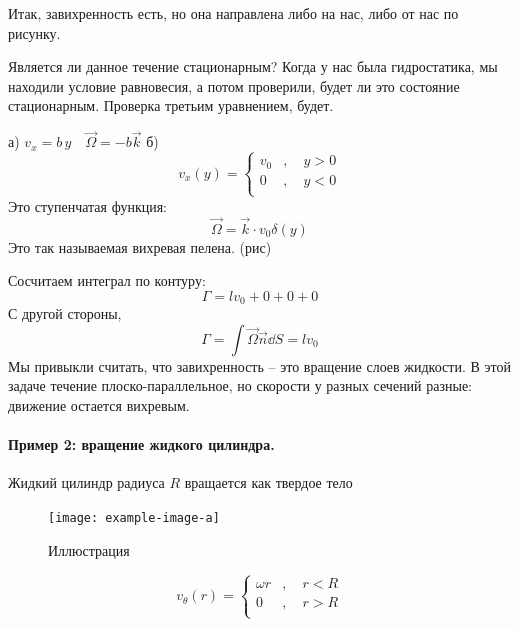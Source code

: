 Итак, завихренность есть, но она направлена либо на нас, либо от нас по рисунку.

Является ли данное течение стационарным? Когда у нас была гидростатика, мы находили условие равновесия, а потом проверили, будет ли это состояние стационарным. Проверка третьим уравнением, будет.

а) $v_x=b\, y \quad \vec{\Omega}=-b\vec{k}$
б)
\begin{equation}
	v_x(y)=\left\{
	\begin{aligned}
		v_0&, \quad y>0\\
		0&, \quad y<0\\
	\end{aligned}
	\right.
\end{equation}
Это ступенчатая функция:
\begin{equation}
	\vec{\Omega}=\vec{k}\cdot v_0\delta(y)
\end{equation}
Это так называемая вихревая пелена. (рис)

Сосчитаем интеграл по контуру:
\begin{equation}
	\Gamma=lv_0+0+0+0
\end{equation}
С другой стороны,
\begin{equation}
	\Gamma=\int \vec{\Omega}\vec{n}\dd S = lv_0
\end{equation}
Мы привыкли считать, что завихренность  -- это вращение слоев жидкости. В этой задаче течение плоско-параллельное, но скорости у разных сечений разные: движение остается вихревым.

\paragraph{Пример 2: вращение жидкого цилиндра.} 
Жидкий цилиндр радиуса $R$ вращается как твердое тело
\begin{figure}[h!]
    \centering
    \texttt{[image: example-image-a]}
    \caption{Иллюстрация}
    \label{fig:figure1}
\end{figure}
\begin{equation}
	v_\theta(r)=\left\{
	\begin{aligned}
		\omega r&, \quad r<R\\
		0&, \quad r>R\\
	\end{aligned}
	\right.
\end{equation}

